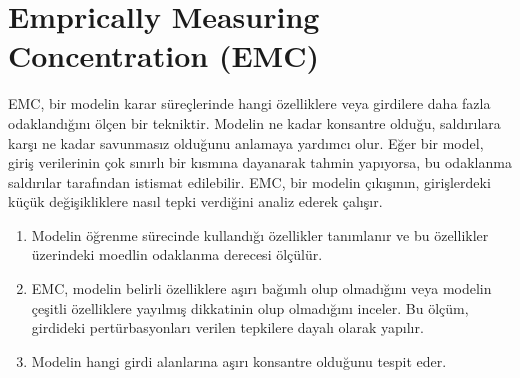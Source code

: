 \section{Emprically Measuring Concentration (EMC)}

EMC, bir modelin karar süreçlerinde hangi özelliklere veya girdilere daha fazla odaklandığını ölçen bir tekniktir. Modelin ne kadar konsantre olduğu, saldırılara karşı ne kadar savunmasız olduğunu anlamaya yardımcı olur. Eğer bir model, giriş verilerinin çok sınırlı bir kısmına dayanarak tahmin yapıyorsa, bu odaklanma saldırılar tarafından istismat edilebilir. EMC, bir modelin çıkışının, girişlerdeki küçük değişikliklere nasıl tepki verdiğini analiz ederek çalışır. 

\begin{enumerate}
    \item Modelin öğrenme sürecinde kullandığı özellikler tanımlanır ve bu özellikler üzerindeki moedlin odaklanma derecesi ölçülür.
    \item EMC, modelin belirli özelliklere aşırı bağımlı olup olmadığını veya modelin çeşitli özelliklere yayılmış dikkatinin olup olmadığını inceler. Bu ölçüm, girdideki pertürbasyonları verilen tepkilere dayalı olarak yapılır.
    \item Modelin hangi girdi alanlarına aşırı konsantre olduğunu tespit eder. 
\end{enumerate}

\newpage